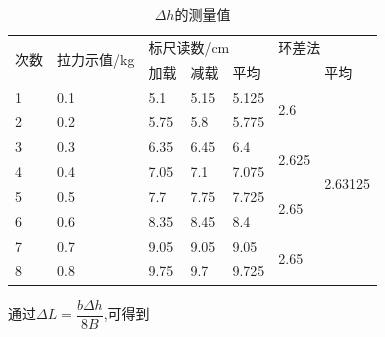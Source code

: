 \documentclass[UTF8]{article}
\begin{document}
\begin{table}[h]
	
	\centering
	\begin{tabular}{|l|l|lll|ll|}
		\hline
		\multirow{2}{*}{次数} & \multirow{2}{*}{拉力示值/kg} & \multicolumn{3}{l|}{标尺读数/cm}                                  & \multicolumn{2}{l|}{环差法}                                               \\ \cline{3-7} 
		&                          & \multicolumn{1}{l|}{加载}   & \multicolumn{1}{l|}{减载}   & 平均    & \multicolumn{1}{l|}{}                       & 平均                       \\ \hline
		1                   & 0.1                       & \multicolumn{1}{l|}{5.1}  & \multicolumn{1}{l|}{5.15} & 5.125 & \multicolumn{1}{l|}{\multirow{2}{*}{2.6}}   & \multirow{8}{*}{2.63125} \\ \cline{1-5}
		2                   & 0.2                      & \multicolumn{1}{l|}{5.75} & \multicolumn{1}{l|}{5.8}  & 5.775 & \multicolumn{1}{l|}{}                       &                          \\ \cline{1-6}
		3                   & 0.3                        & \multicolumn{1}{l|}{6.35} & \multicolumn{1}{l|}{6.45} & 6.4   & \multicolumn{1}{l|}{\multirow{2}{*}{2.625}} &                          \\ \cline{1-5}
		4                   & 0.4                        & \multicolumn{1}{l|}{7.05} & \multicolumn{1}{l|}{7.1}  & 7.075 & \multicolumn{1}{l|}{}                       &                          \\ \cline{1-6}
		5                   & 0.5                        & \multicolumn{1}{l|}{7.7}  & \multicolumn{1}{l|}{7.75} & 7.725 & \multicolumn{1}{l|}{\multirow{2}{*}{2.65}}  &                          \\ \cline{1-5}
		6                   & 0.6                      & \multicolumn{1}{l|}{8.35} & \multicolumn{1}{l|}{8.45} & 8.4   & \multicolumn{1}{l|}{}                       &                          \\ \cline{1-6}
		7                   & 0.7                        & \multicolumn{1}{l|}{9.05} & \multicolumn{1}{l|}{9.05} & 9.05  & \multicolumn{1}{l|}{\multirow{2}{*}{2.65}}  &                          \\ \cline{1-5}
		8                   & 0.8                      & \multicolumn{1}{l|}{9.75} & \multicolumn{1}{l|}{9.7}  & 9.725 & \multicolumn{1}{l|}{}                       &     \\ \hline
	\end{tabular}
	\caption{$\Delta h$的测量值}
\end{table}\par 通过$\Delta L = \dfrac{b\Delta h}{8B}$,可得到
\end{document}
